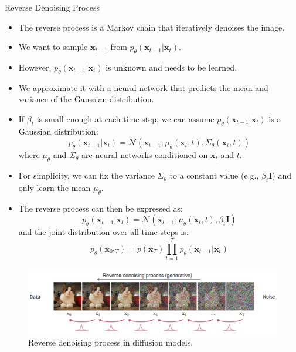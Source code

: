 \begin{frame}[allowframebreaks]{Reverse Denoising Process}
    \begin{itemize}
        \item The reverse process is a Markov chain that iteratively denoises the image.
        \item We want to sample $\mathbf{x}_{t-1}$ from $p_\theta(\mathbf{x}_{t-1}|\mathbf{x}_t)$.
        \item However, $p_\theta(\mathbf{x}_{t-1}|\mathbf{x}_t)$ is unknown and needs to be learned.
        
\framebreak
        
        \item We approximate it with a neural network that predicts the mean and variance of the Gaussian distribution.
        \item If $\beta_t$ is small enough at each time step, we can assume $p_\theta(\mathbf{x}_{t-1}|\mathbf{x}_t)$ is a Gaussian distribution:
        $$
        p_\theta (\mathbf{x}_{t-1} | \mathbf{x}_t) = \mathcal{N}(\mathbf{x}_{t-1}; \mu_\theta(\mathbf{x}_{t}, t), \Sigma_\theta (\mathbf{x}_{t}, t))
        $$
        where $\mu_\theta$ and $\Sigma_\theta$ are neural networks conditioned on $\mathbf{x}_t$ and $t$.
    \end{itemize}
\framebreak
    \begin{itemize}
        \item For simplicity, we can fix the variance $\Sigma_\theta$ to a constant value (e.g., $\beta_t \mathbf{I}$) and only learn the mean $\mu_\theta$.
        
\framebreak
        
        \item The reverse process can then be expressed as:
        $$
        p_\theta (\mathbf{x}_{t-1} | \mathbf{x}_t) = \mathcal{N}(\mathbf{x}_{t-1}; \mu_\theta(\mathbf{x}_{t}, t), \beta_t \mathbf{I})
        $$
        and the joint distribution over all time steps is:
        $$
        p_\theta(\mathbf{x}_{0:T}) = p(\mathbf{x}_T) \prod_{t=1}^T p_\theta (\mathbf{x}_{t-1} | \mathbf{x}_t)
        $$
    \end{itemize}
    \begin{figure}
        \centering
        \includegraphics[height=0.4\textheight, width=\textwidth, keepaspectratio]{images/diffusion/diff_4.png}
        \caption*{Reverse denoising process in diffusion models.}
    \end{figure}
\end{frame}